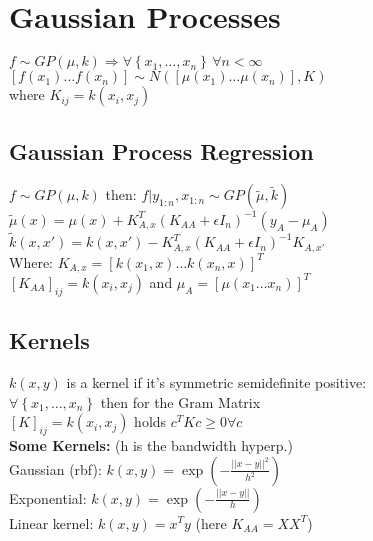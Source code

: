 \section{Gaussian Processes}
$f\sim GP(\mu,k)\Rightarrow\forall \left\{x_1, \dots, x_n\right\} \,\forall n < \infty$\\
$\left[f(x_1)\dots f(x_n)\right]\sim N(\left[\mu(x_1)\dots \mu(x_n)\right], K)$\\ where $K_{ij}=k(x_i,x_j)$
\subsection{Gaussian Process Regression}
$f\sim GP(\mu,k)$ then: $f\vert y_{1:n},x_{1:n} \sim GP(\tilde{\mu},\tilde{k})$\\
$\tilde{\mu}(x) = \mu(x) + K_{A, x}^T{(K_{AA}+\epsilon I_n)}^{-1}\left(y_A-\mu_A\right)$\\
$\tilde{k}(x,x') = k(x,x') - K_{A,x}^T{(K_{AA}+\epsilon I_n)}^{-1} K_{A,x'}$\\
Where: $K_{A,x} = {\left[k(x_1,x)\dots k(x_n,x)\right]}^T$\\
${\left[K_{AA}\right]}_{ij} = k(x_i, x_j)$ and $\mu_A = {\left[\mu(x_1 \dots x_n)\right]}^T$\\


\subsection{Kernels}
	$k(x,y)$ is a kernel if it's symmetric semidefinite positive:\\
	$\forall \left\{x_1, \dots, x_n \right\}$ then for the Gram Matrix \\
	${\left[K\right]}_{ij}=k(x_i,x_j)$ holds $c^TKc\geq0\forall c$\\
    \textbf{Some Kernels:} (h is the bandwidth hyperp.)\\
    Gaussian (rbf): $k(x,y) = \exp( -\tfrac{||x-y||^2}{h^2})$\\
    Exponential: $k(x,y) = \exp( -\tfrac{||x-y||}{h})$\\
    Linear kernel: $k(x,y) = x^Ty$ (here $K_{AA} = XX^T$)\\
